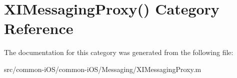 \hypertarget{category_x_i_messaging_proxy_07_08}{}\section{X\+I\+Messaging\+Proxy() Category Reference}
\label{category_x_i_messaging_proxy_07_08}


The documentation for this category was generated from the following file\+:\begin{DoxyCompactItemize}
\item 
src/common-\/i\+O\+S/common-\/i\+O\+S/\+Messaging/X\+I\+Messaging\+Proxy.\+m\end{DoxyCompactItemize}
